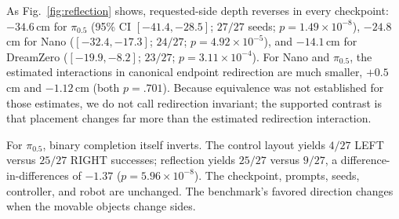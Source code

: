As Fig.~\ref{fig:reflection} shows, requested-side depth reverses in every checkpoint: $-34.6$\,cm for $\pi_{0.5}$ (95\% CI $[-41.4,-28.5]$; $27/27$ seeds; $p=1.49\times10^{-8}$), $-24.8$\,cm for Nano ($[-32.4,-17.3]$; $24/27$; $p=4.92\times10^{-5}$), and $-14.1$\,cm for DreamZero ($[-19.9,-8.2]$; $23/27$; $p=3.11\times10^{-4}$). For Nano and $\pi_{0.5}$, the estimated interactions in canonical endpoint redirection are much smaller, $+0.5$\,cm and $-1.12$\,cm (both $p=.701$). Because equivalence was not established for those estimates, we do not call redirection invariant; the supported contrast is that placement changes far more than the estimated redirection interaction.

For $\pi_{0.5}$, binary completion itself inverts. The control layout yields $4/27$ LEFT versus $25/27$ RIGHT successes; reflection yields $25/27$ versus $9/27$, a difference-in-differences of $-1.37$ ($p=5.96\times10^{-8}$). The checkpoint, prompts, seeds, controller, and robot are unchanged. The benchmark's favored direction changes when the movable objects change sides.
